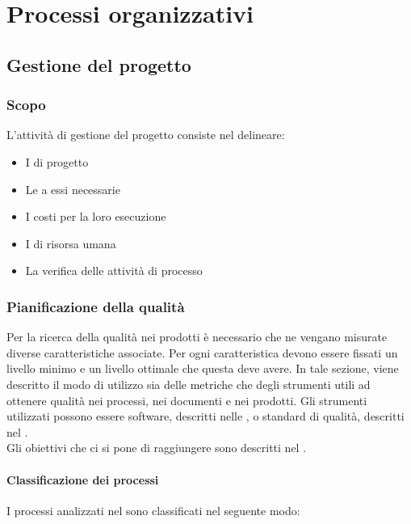 \section{Processi organizzativi}

    \subsection{Gestione del progetto}\label{GestioneProgetto}

	    \subsubsection{Scopo}
	    L'attività di gestione del progetto consiste nel delineare:
	    \begin{itemize}
	    	\item I  di progetto
	    	\item Le  a essi necessarie
	    	\item I costi per la loro esecuzione
	    	\item I  di risorsa umana
	    	\item La verifica delle attività di processo
	    \end{itemize}
    
        \subsubsection{Pianificazione della qualità}\label{PianificazioneQualità}
        Per la ricerca della qualità nei prodotti è necessario che ne vengano misurate diverse caratteristiche associate.
        Per ogni caratteristica devono essere fissati un livello minimo e un livello ottimale che questa deve avere.
        In tale sezione, viene descritto il modo di utilizzo sia delle metriche che degli strumenti utili ad ottenere qualità nei processi, nei documenti e nei prodotti.
        Gli strumenti utilizzati possono essere software, descritti nelle \Doc{\NdPv}, o standard di qualità, descritti nel \Doc{\PdQv}.\\
        Gli obiettivi che ci si pone di raggiungere sono descritti nel \Doc{\PdQv}.
        
        \paragraph{Classificazione dei processi}
        I processi analizzati nel \Doc{\PdQv} sono classificati nel seguente modo:
        
